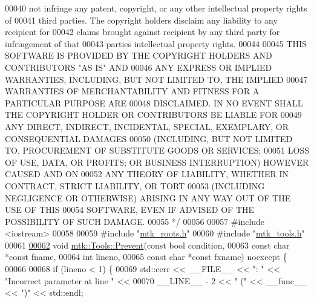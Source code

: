 \begin{DoxyCode}
00040 \textcolor{comment}{not infringe any patent, copyright, or any other intellectual property rights of}
00041 \textcolor{comment}{third parties. The copyright holders disclaim any liability to any recipient for}
00042 \textcolor{comment}{claims brought against recipient by any third party for infringement of that}
00043 \textcolor{comment}{parties intellectual property rights.}
00044 \textcolor{comment}{}
00045 \textcolor{comment}{THIS SOFTWARE IS PROVIDED BY THE COPYRIGHT HOLDERS AND CONTRIBUTORS "AS IS" AND}
00046 \textcolor{comment}{ANY EXPRESS OR IMPLIED WARRANTIES, INCLUDING, BUT NOT LIMITED TO, THE IMPLIED}
00047 \textcolor{comment}{WARRANTIES OF MERCHANTABILITY AND FITNESS FOR A PARTICULAR PURPOSE ARE}
00048 \textcolor{comment}{DISCLAIMED. IN NO EVENT SHALL THE COPYRIGHT HOLDER OR CONTRIBUTORS BE LIABLE FOR}
00049 \textcolor{comment}{ANY DIRECT, INDIRECT, INCIDENTAL, SPECIAL, EXEMPLARY, OR CONSEQUENTIAL DAMAGES}
00050 \textcolor{comment}{(INCLUDING, BUT NOT LIMITED TO, PROCUREMENT OF SUBSTITUTE GOODS OR SERVICES;}
00051 \textcolor{comment}{LOSS OF USE, DATA, OR PROFITS; OR BUSINESS INTERRUPTION) HOWEVER CAUSED AND ON}
00052 \textcolor{comment}{ANY THEORY OF LIABILITY, WHETHER IN CONTRACT, STRICT LIABILITY, OR TORT}
00053 \textcolor{comment}{(INCLUDING NEGLIGENCE OR OTHERWISE) ARISING IN ANY WAY OUT OF THE USE OF THIS}
00054 \textcolor{comment}{SOFTWARE, EVEN IF ADVISED OF THE POSSIBILITY OF SUCH DAMAGE.}
00055 \textcolor{comment}{*/}
00056 
00057 \textcolor{preprocessor}{#include <iostream>}
00058 
00059 \textcolor{preprocessor}{#include "\hyperlink{mtk__roots_8h}{mtk\_roots.h}"}
00060 \textcolor{preprocessor}{#include "\hyperlink{mtk__tools_8h}{mtk\_tools.h}"}
00061 
\hypertarget{mtk__tools_8cc_source_l00062}{}\hyperlink{classmtk_1_1Tools_a332324c6f25e66be9dff48c5987a3b9f}{00062} \textcolor{keywordtype}{void} \hyperlink{classmtk_1_1Tools_a332324c6f25e66be9dff48c5987a3b9f}{mtk::Tools::Prevent}(\textcolor{keyword}{const} \textcolor{keywordtype}{bool} condition,
00063                          \textcolor{keyword}{const} \textcolor{keywordtype}{char} *\textcolor{keyword}{const} fname,
00064                          \textcolor{keywordtype}{int} lineno,
00065                          \textcolor{keyword}{const} \textcolor{keywordtype}{char} *\textcolor{keyword}{const} fxname) noexcept \{
00066 
00068   \textcolor{keywordflow}{if} (lineno < 1) \{
00069     std::cerr << \_\_FILE\_\_ << \textcolor{stringliteral}{": "} << \textcolor{stringliteral}{"Incorrect parameter at line "} <<
00070     \_\_LINE\_\_ - 2 << \textcolor{stringliteral}{" ("} << \_\_func\_\_ << \textcolor{stringliteral}{")"} << std::endl;

\end{DoxyCode}
